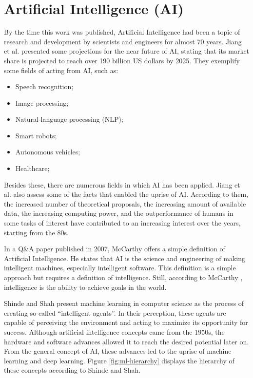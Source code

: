 \section{Artificial Intelligence (AI)}

By the time this work was published, Artificial Intelligence had been a topic of research and development by scientists and engineers for almost 70 years. Jiang et al. \cite{jiang2022quo} presented some projections for the near future of AI, stating that its market share is projected to reach over 190 billion US dollars by 2025. They exemplify some fields of acting from AI, such as:

\begin{itemize}
	\item Speech recognition;
	\item Image processing;
	\item Natural-language processing (NLP);
	\item Smart robots;
	\item Autonomous vehicles;
	\item Healthcare;
\end{itemize}

Besides these, there are numerous fields in which AI has been applied. Jiang et al. \cite{jiang2022quo} also assess some of the facts that enabled the uprise of AI. According to them, the increased number of theoretical proposals, the increasing amount of available data, the increasing computing power, and the outperformance of humans in some tasks of interest have contributed to an increasing interest over the years, starting from the 80s.

In a Q\&A paper published in 2007, McCarthy \cite{mccarthy2007artificial} offers a simple definition of Artificial Intelligence. He states that AI is the science and engineering of making intelligent machines, especially intelligent software. This definition is a simple approach but requires a definition of intelligence. Still, according to McCarthy \cite{mccarthy2007artificial}, intelligence is the ability to achieve goals in the world.

Shinde and Shah \cite{shinde2018review} present machine learning in computer science as the process of creating so-called ``intelligent agents''. In their perception, these agents are capable of perceiving the environment and acting to maximize its opportunity for success. Although artificial intelligence concepts came from the 1950s, the hardware and software advances allowed it to reach the desired potential later on. From the general concept of AI, these advances led to the uprise of machine learning and deep learning. Figure \ref{fig:ml-hierarchy} displays the hierarchy of these concepts according to Shinde and Shah.

